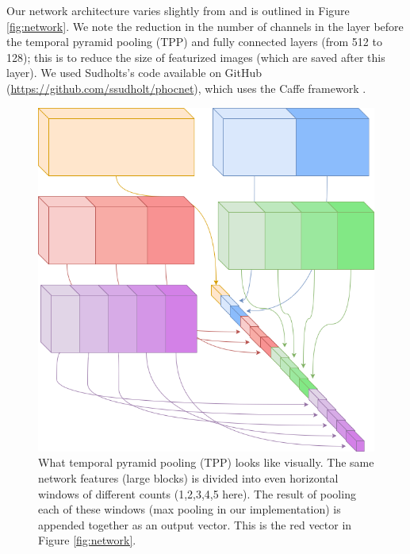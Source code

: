 \documentclass[ms,electronic,twosidetoc,letterpaper,chaptercenter,parttop,lof,lot]{byumsphd}
\begin{document}
Our network architecture varies slightly from \cite{sudholt2017} and is outlined in Figure \ref{fig:network}. We note the reduction in the number of channels in the layer before the temporal pyramid pooling (TPP) and fully connected layers (from 512 to 128); this is to reduce the size of featurized images (which are saved after this layer).  We used Sudholts's code available on GitHub (\url{https://github.com/ssudholt/phocnet}), which uses the Caffe framework \cite{caffe}.



\begin{figure}
    \centering
    \includegraphics[width=.55\textwidth]{TPP_example}
    \caption{What temporal pyramid pooling (TPP) looks like visually. The same network features (large blocks) is divided into even horizontal windows of different counts (1,2,3,4,5 here). The result of pooling each of these windows (max pooling in our implementation) is appended together as an output vector. This is the red vector in Figure \ref{fig:network}.}
    \label{fig:TPP_example}
\end{figure}
\end{document}
